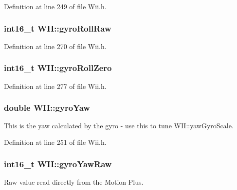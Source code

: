 \-Definition at line 249 of file \-Wii.\-h.

\hypertarget{class_w_i_i_a0784c779ebeae2d459996c35a54ee3b8}{
\subsubsection[{gyro\-Roll\-Raw}]{\setlength{\rightskip}{0pt plus 5cm}int16\-\_\-t {\bf \-W\-I\-I\-::gyro\-Roll\-Raw}}}\label{class_w_i_i_a0784c779ebeae2d459996c35a54ee3b8}


\-Definition at line 270 of file \-Wii.\-h.

\hypertarget{class_w_i_i_a10d91cd5d73bc655be776b44d27004c9}{
\subsubsection[{gyro\-Roll\-Zero}]{\setlength{\rightskip}{0pt plus 5cm}int16\-\_\-t {\bf \-W\-I\-I\-::gyro\-Roll\-Zero}}}\label{class_w_i_i_a10d91cd5d73bc655be776b44d27004c9}


\-Definition at line 277 of file \-Wii.\-h.

\hypertarget{class_w_i_i_a988db5b35cfc3c543f93f49587a50e62}{
\subsubsection[{gyro\-Yaw}]{\setlength{\rightskip}{0pt plus 5cm}double {\bf \-W\-I\-I\-::gyro\-Yaw}}}\label{class_w_i_i_a988db5b35cfc3c543f93f49587a50e62}
\-This is the yaw calculated by the gyro -\/ use this to tune \hyperlink{class_w_i_i_a0694969a30092b9b1dcb26120c7cff73}{\-W\-I\-I\-::yaw\-Gyro\-Scale}. 

\-Definition at line 251 of file \-Wii.\-h.

\hypertarget{class_w_i_i_ab813b65548e827f41a5192fcc34056ea}{
\subsubsection[{gyro\-Yaw\-Raw}]{\setlength{\rightskip}{0pt plus 5cm}int16\-\_\-t {\bf \-W\-I\-I\-::gyro\-Yaw\-Raw}}}\label{class_w_i_i_ab813b65548e827f41a5192fcc34056ea}
\-Raw value read directly from the \-Motion \-Plus. 

